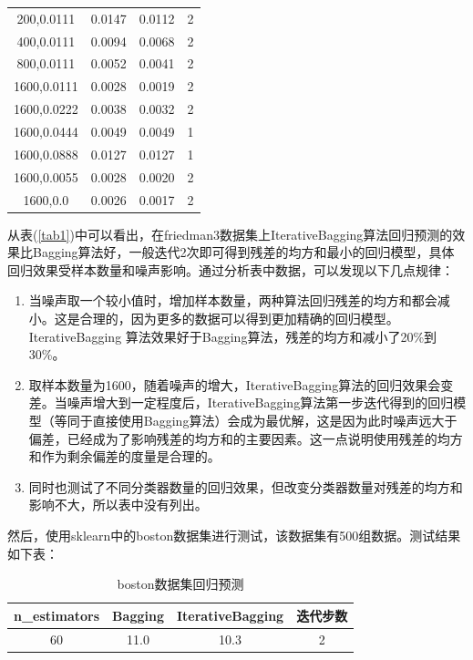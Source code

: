 \documentclass[a4paper,oneside,12pt]{article}
\begin{document}
\begin{spacing}{1.5}
\begin{table}[htbp]
\begin{tabular}{cccc}
200,0.0111 &0.0147 &0.0112 &2\\

400,0.0111 &0.0094 &0.0068 &2\\

800,0.0111 &0.0052 &0.0041 &2\\

1600,0.0111 &0.0028 &0.0019 &2\\

1600,0.0222 &0.0038 &0.0032 &2\\

1600,0.0444 &0.0049 &0.0049 &1\\

1600,0.0888 &0.0127 &0.0127 &1\\

1600,0.0055 &0.0028 &0.0020 &2\\

1600,0.0 &0.0026 &0.0017 &2\\
\bottomrule
\end{tabular}
\end{table}
从表(\ref{tab1})中可以看出，在friedman3数据集上IterativeBagging算法回归预测的效果比Bagging算法好，一般迭代2次即可得到残差的均方和最小的回归模型，具体回归效果受样本数量和噪声影响。通过分析表中数据，可以发现以下几点规律：\par
\begin{enumerate}
\item 当噪声取一个较小值时，增加样本数量，两种算法回归残差的均方和都会减小。这是合理的，因为更多的数据可以得到更加精确的回归模型。IterativeBagging 算法效果好于Bagging算法，残差的均方和减小了20\%到30\%。
\item 取样本数量为1600，随着噪声的增大，IterativeBagging算法的回归效果会变差。当噪声增大到一定程度后，IterativeBagging算法第一步迭代得到的回归模型（等同于直接使用Bagging算法）会成为最优解，这是因为此时噪声远大于偏差，已经成为了影响残差的均方和的主要因素。这一点说明使用残差的均方和作为剩余偏差的度量是合理的。
\item 同时也测试了不同分类器数量的回归效果，但改变分类器数量对残差的均方和影响不大，所以表中没有列出。
\end{enumerate}
\par
然后，使用sklearn中的boston数据集进行测试，该数据集有500组数据。测试结果如下表：\par
\begin{table}[htbp]
\caption{\label{tab2}boston数据集回归预测}
\center
\begin{tabular}{cccc}
\toprule
n\_estimators &Bagging &IterativeBagging &迭代步数\\
\midrule
60 &11.0 &10.3 &2\\


\end{tabular}
\end{table}
\end{spacing}
\end{document}

